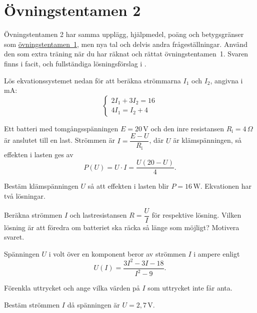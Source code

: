
\section{Övningstentamen 2}
\label{c19:sec:ovningstentamen2}
Övningstentamen 2 har samma upplägg, hjälpmedel, poäng och betygsgränser som
\hyperref[c19:sec:ovningstentamen]{övningstentamen~1}, men nya tal och delvis andra frågeställningar.
Använd den som extra träning när du har räknat och rättat övningstentamen~1. Svaren finns i facit,
och fullständiga lösningsförslag i .


Lös ekvationssystemet nedan för att beräkna strömmarna $I_1$ och $I_2$, angivna i mA:
\[
  \begin{cases}
    2I_1 + 3I_2 = 16 \\
    4I_1 = I_2 + 4
  \end{cases}
\]

Ett batteri med tomgångsspänningen $E = 20\,\text{V}$ och den inre resistansen
$R_{\text{i}} = 4\,\Omega$ är anslutet till en last. Strömmen är
$I = \dfrac{E - U}{R_{\text{i}}}$, där $U$ är klämspänningen, så effekten i lasten ges av
\[
  P(U) = U \cdot I = \frac{U(20 - U)}{4}.
\]
\begin{parts}
  \item Bestäm klämspänningen $U$ så att effekten i lasten blir $P = 16\,\text{W}$. Ekvationen har
    två lösningar.
  \item Beräkna strömmen $I$ och lastresistansen $R = \dfrac{U}{I}$ för respektive lösning. Vilken
    lösning är att föredra om batteriet ska räcka så länge som möjligt? Motivera svaret.
\end{parts}

Spänningen $U$ i volt över en komponent beror av strömmen $I$ i ampere enligt
\[
  U(I) = \frac{3I^2 - 3I - 18}{I^2 - 9}.
\]
\begin{parts}
  \item Förenkla uttrycket och ange vilka värden på $I$ som uttrycket inte får anta.
  \item Bestäm strömmen $I$ då spänningen är $U = 2{,}7\,\text{V}$.
\end{parts}

